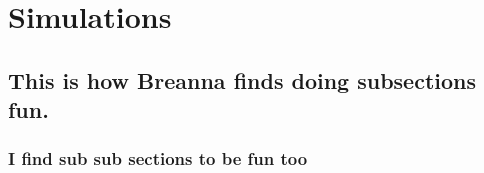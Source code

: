 \section{Simulations}
\subsection{This is how Breanna finds doing subsections fun.}
\subsubsection{I find sub sub sections to be fun too}
